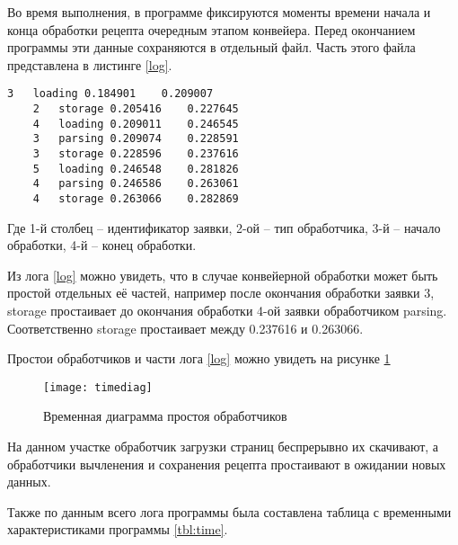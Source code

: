 Во время выполнения, в программе фиксируются моменты времени начала и конца обработки рецепта очередным этапом конвейера. Перед окончанием программы эти данные сохраняются в отдельный файл. Часть этого файла представлена в листинге \ref{log}.

\begin{lstlisting}[label=log, caption={Часть лога, сформированного конвейром}]
	3	loading	0.184901	0.209007
	2	storage	0.205416	0.227645
	4	loading	0.209011	0.246545
	3	parsing	0.209074	0.228591
	3	storage	0.228596	0.237616
	5	loading	0.246548	0.281826
	4	parsing	0.246586	0.263061
	4	storage	0.263066	0.282869
\end{lstlisting}
Где 1-й столбец -- идентификатор заявки, 2-ой -- тип обработчика, 3-й -- начало обработки, 4-й -- конец обработки.

Из лога \ref{log} можно увидеть, что в случае конвейерной обработки может быть простой отдельных её частей, например после окончания обработки заявки 3, storage простаивает до окончания обработки 4-ой заявки обработчиком parsing. Соответственно storage простаивает между 0.237616 и 0.263066.

Простои обработчиков и части лога \ref{log} можно увидеть на рисунке \ref{timediag}

\begin{figure}[h]
	\centering
	\texttt{[image: timediag]}
	\caption{Временная диаграмма простоя обработчиков}
	\label{timediag}
\end{figure}

На данном участке обработчик загрузки страниц беспрерывно их скачивают, а обработчики вычленения и сохранения рецепта простаивают в ожидании новых данных.

Также по данным всего лога программы была составлена таблица с временными характеристиками программы \ref{tbl:time}.


